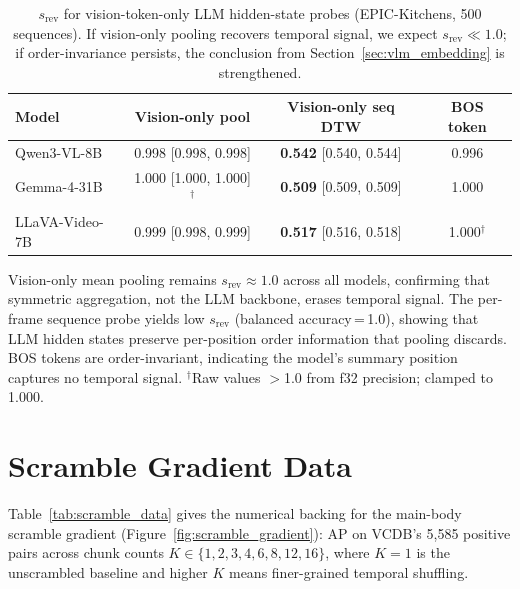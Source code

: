 \documentclass{article}
\theoremstyle{remark}
\begin{document}
\begin{table}[h]
\centering
\caption{$s_\text{rev}$ for vision-token-only LLM hidden-state probes (EPIC-Kitchens, 500 sequences). If vision-only pooling recovers temporal signal, we expect $s_\text{rev} \ll 1.0$; if order-invariance persists, the conclusion from Section~\ref{sec:vlm_embedding} is strengthened.}
\label{tab:vision_token_probe}
\begin{tabular}{lccc}
\toprule
\textbf{Model} & \textbf{Vision-only pool} & \textbf{Vision-only seq DTW} & \textbf{BOS token} \\
\midrule
Qwen3-VL-8B    & 0.998 [0.998, 0.998] & \textbf{0.542} [0.540, 0.544] & 0.996 \\
Gemma-4-31B    & 1.000 [1.000, 1.000]$^\dagger$ & \textbf{0.509} [0.509, 0.509] & 1.000 \\
LLaVA-Video-7B & 0.999 [0.998, 0.999] & \textbf{0.517} [0.516, 0.518] & 1.000$^\dagger$ \\
\bottomrule
\end{tabular}
\begin{flushleft}
\small Vision-only mean pooling remains $s_\text{rev} \approx 1.0$ across all models, confirming that symmetric aggregation, not the LLM backbone, erases temporal signal. The per-frame sequence probe yields low $s_\text{rev}$ (balanced accuracy\,=\,1.0), showing that LLM hidden states preserve per-position order information that pooling discards. BOS tokens are order-invariant, indicating the model's summary position captures no temporal signal. $^\dagger$Raw values $>$1.0 from f32 precision; clamped to 1.000.
\end{flushleft}
\end{table}

\section{Scramble Gradient Data}
\label{sec:scramble_data}

Table~\ref{tab:scramble_data} gives the numerical backing for the main-body scramble gradient (Figure~\ref{fig:scramble_gradient}): AP on VCDB's 5{,}585 positive pairs across chunk counts $K \in \{1, 2, 3, 4, 6, 8, 12, 16\}$, where $K\!=\!1$ is the unscrambled baseline and higher $K$ means finer-grained temporal shuffling.
\end{document}
